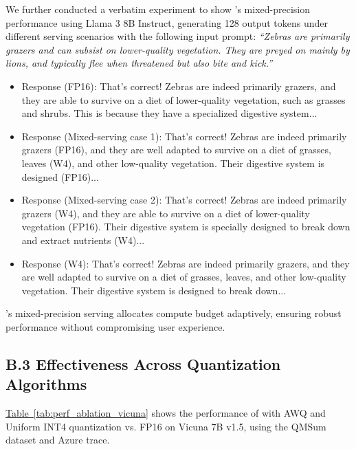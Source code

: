 {We further conducted a verbatim experiment to show {\system}'s mixed-precision performance using Llama 3 8B Instruct, generating 128 output tokens under different serving scenarios with the following input prompt: \textit{``Zebras are primarily grazers and can subsist on lower-quality vegetation. They are preyed on mainly by lions, and typically flee when threatened but also bite and kick.''}}

{
\begin{itemize}
    \item Response (FP16): That's correct! Zebras are indeed primarily grazers, and they are able to survive on a diet of lower-quality vegetation, such as grasses and shrubs. This is because they have a specialized digestive system...
    \item Response (Mixed-serving case 1): That's correct! Zebras are indeed primarily grazers (FP16), and they are well adapted to survive on a diet of grasses, leaves (W4), and other low-quality vegetation. Their digestive system is designed (FP16)...
    \item Response (Mixed-serving case 2): That's correct! Zebras are indeed primarily grazers (W4), and they are able to survive on a diet of lower-quality vegetation (FP16). Their digestive system is specially designed to break down and extract nutrients (W4)...
    \item Response (W4): That's correct! Zebras are indeed primarily grazers, and they are well adapted to survive on a diet of grasses, leaves, and other low-quality vegetation. Their digestive system is designed to break down...
\end{itemize}
}

{{\system}'s mixed-precision serving allocates compute budget adaptively, ensuring robust performance without compromising user experience.}

\subsection*{B.3 \quad Effectiveness Across Quantization Algorithms}\label{appendix:effective_across_quant}

{\hyperref[tab:perf_ablation_vicuna]{Table~\ref{tab:perf_ablation_vicuna}} shows the performance of {\system} with AWQ and Uniform INT4 quantization vs. FP16 on Vicuna 7B v1.5, using the QMSum dataset and Azure trace.}


